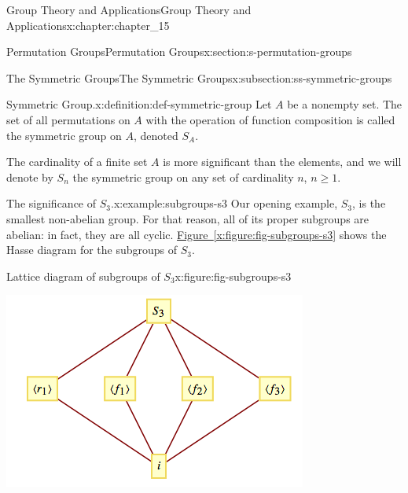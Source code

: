 \documentclass[oneside,10pt,]{book}
\newcommand{\xreffont}{\relax}
\numberwithin{equation}{section}
\begin{document}
\begin{chapterptx}{Group Theory and Applications}{}{Group Theory and Applications}{}{}{x:chapter:chapter_15}
\begin{sectionptx}{Permutation Groups}{}{Permutation Groups}{}{}{x:section:s-permutation-groups}
\begin{subsectionptx}{The Symmetric Groups}{}{The Symmetric Groups}{}{}{x:subsection:ss-symmetric-groups}
\begin{definition}{Symmetric Group.}{x:definition:def-symmetric-group}%
%
\label{g:notation:idm546593312064}%
\label{g:notation:idm546593311088}%
Let \(A\) be a nonempty set. The set of all permutations on \(A\) with the operation of function composition is called the symmetric group on \(A\), denoted \(S_A\).%
\par
The cardinality of a finite set \(A\) is more significant than the elements, and we will denote by \(S_n\) the symmetric group on any set of cardinality \(n\), \(n\geq 1\).%
\end{definition}
\begin{example}{The significance of \(S_3\).}{x:example:subgroups-s3}%
Our opening example, \(S_3\), is the smallest non-abelian group. For that reason, all of its proper subgroups are abelian: in fact, they are all cyclic. \hyperref[x:figure:fig-subgroups-s3]{Figure~{\xreffont\ref{x:figure:fig-subgroups-s3}}} shows the Hasse diagram for the subgroups of \(S_3\).%
\begin{figureptx}{Lattice diagram of subgroups of \(S_3\)}{x:figure:fig-subgroups-s3}{}%
\begin{image}{0.15}{0.7}{0.15}%
\includegraphics[width=\linewidth]{images/fig-subgroups-s3.png}
\end{image}%
\tcblower
\end{figureptx}%
\end{example}
\end{subsectionptx}
\end{sectionptx}
\end{chapterptx}
\end{document}
